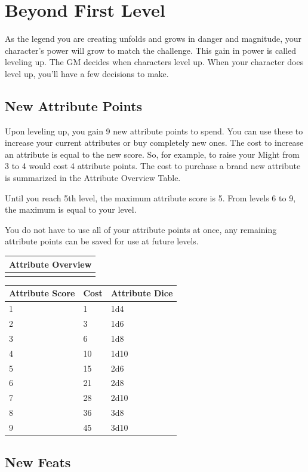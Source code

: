 \documentclass[12pt]{report}
\begin{document}
\section{Beyond First Level}\label{beyond-first-level}

As the legend you are creating unfolds and grows in danger and
magnitude, your character's power will grow to match the challenge. This
gain in power is called leveling up. The GM decides when characters
level up. When your character does level up, you'll have a few decisions
to make.

\subsection{New Attribute Points}\label{new-attribute-points}

Upon leveling up, you gain 9 new attribute points to spend. You can use
these to increase your current attributes or buy completely new ones.
The cost to increase an attribute is equal to the new score. So, for
example, to raise your Might from 3 to 4 would cost 4 attribute points.
The cost to purchase a brand new attribute is summarized in the
Attribute Overview Table.

Until you reach 5th level, the maximum attribute score is 5. From levels
6 to 9, the maximum is equal to your level.

You do not have to use all of your attribute points at once, any
remaining attribute points can be saved for use at future levels.

\begin{longtable}[c]{@{}l@{}}
\toprule
Attribute Overview\tabularnewline
\midrule
\endhead
\tabularnewline
\bottomrule
\end{longtable}

\begin{longtable}[c]{@{}lll@{}}
\toprule
Attribute Score & Cost & Attribute Dice\tabularnewline
\midrule
\endhead
1 & 1 & 1d4\tabularnewline
2 & 3 & 1d6\tabularnewline
3 & 6 & 1d8\tabularnewline
4 & 10 & 1d10\tabularnewline
5 & 15 & 2d6\tabularnewline
6 & 21 & 2d8\tabularnewline
7 & 28 & 2d10\tabularnewline
8 & 36 & 3d8\tabularnewline
9 & 45 & 3d10\tabularnewline
\bottomrule
\end{longtable}

\subsection{New Feats}\label{new-feats}
\end{document}
